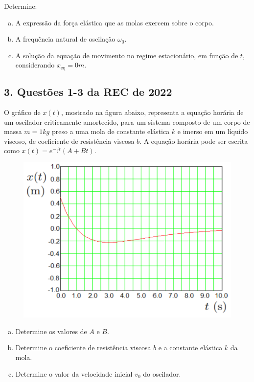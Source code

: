 \documentclass[a4paper,10pt]{article}
\begin{document}
Determine:
\begin{enumerate}[(a)]
\item A expressão da força elástica que as molas exercem sobre o corpo.

\item A frequência natural de oscilação $\omega_0$.

\item A solução da equação de movimento no regime estacionário, em função de $t$,
considerando $x_{\text{eq}}=0 \unit{m}$.
\end{enumerate}


\subsection*{3. Questões 1-3 da REC de 2022}

O gráfico de $x(t)$, mostrado na figura abaixo, representa a equação
horária de um oscilador criticamente amortecido, para um sistema composto de um corpo de massa
$m = 1 \unit{kg}$ preso a uma mola de constante elástica $k$ e imerso em um líquido viscoso, de coeficiente
de resistência viscosa $b$. A equação horária pode ser escrita como $x(t) = e^{-\frac{\gamma}{2} t} (A + Bt)$.
\begin{figure}[H]
\centering
\includegraphics[width=0.9\linewidth]{fig/grafico_rec.png}
\label{fig:grafico_rec}
\end{figure}

\begin{enumerate}[(a)]
\item Determine os valores de $A$ e $B$.

\item Determine o coeficiente de resistência viscosa $b$ e a constante elástica $k$ da mola.

\item Determine o valor da velocidade inicial $v_0$ do oscilador.
\end{enumerate}
\end{document}
